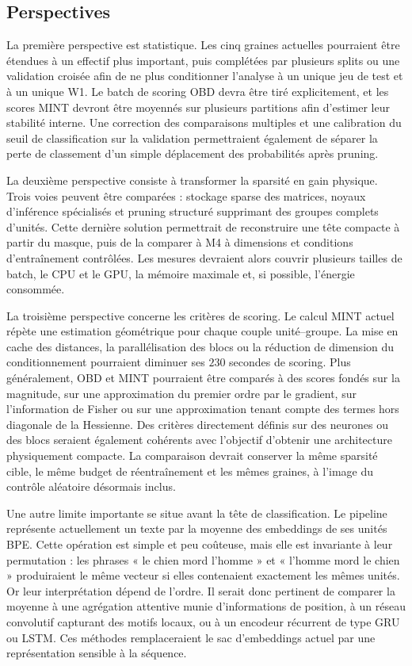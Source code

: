 \subsection{Perspectives}
\label{ssec:conclusion_perspectives}

La première perspective est statistique. Les cinq graines actuelles pourraient
être étendues à un effectif plus important, puis complétées par plusieurs splits
ou une validation croisée afin de ne plus conditionner l'analyse à un unique
jeu de test et à un unique W1. Le batch de scoring OBD devra être tiré
explicitement, et les scores MINT devront être moyennés sur plusieurs partitions
afin d'estimer leur stabilité interne. Une correction des comparaisons multiples
et une calibration du seuil de classification sur la validation permettraient
également de séparer la perte de classement d'un simple déplacement des
probabilités après pruning.

La deuxième perspective consiste à transformer la sparsité en gain physique.
Trois voies peuvent être comparées : stockage sparse des matrices, noyaux
d'inférence spécialisés et pruning structuré supprimant des groupes complets
d'unités. Cette dernière solution permettrait de reconstruire une tête compacte
à partir du masque, puis de la comparer à M4 à dimensions et conditions
d'entraînement contrôlées. Les mesures devraient alors couvrir plusieurs tailles
de batch, le CPU et le GPU, la mémoire maximale et, si possible, l'énergie
consommée.

La troisième perspective concerne les critères de scoring. Le calcul MINT
actuel répète une estimation géométrique pour chaque couple unité--groupe. La
mise en cache des distances, la parallélisation des blocs ou la réduction de
dimension du conditionnement pourraient diminuer ses $230$ secondes de
scoring. Plus généralement, OBD et MINT pourraient être comparés à des scores
fondés sur la magnitude, sur une approximation du premier ordre par le gradient,
sur l'information de Fisher ou sur une approximation tenant compte des termes
hors diagonale de la Hessienne. Des critères directement définis sur des
neurones ou des blocs seraient également cohérents avec l'objectif d'obtenir
une architecture physiquement compacte. La comparaison devrait conserver la
même sparsité cible, le même budget de réentraînement et les mêmes graines, à
l'image du contrôle aléatoire désormais inclus.

Une autre limite importante se situe avant la tête de classification. Le
pipeline représente actuellement un texte par la moyenne des embeddings de ses
unités BPE. Cette opération est simple et peu coûteuse, mais elle est invariante
à leur permutation : les phrases « le chien mord l'homme » et « l'homme mord le
chien » produiraient le même vecteur si elles contenaient exactement les mêmes
unités. Or leur interprétation dépend de l'ordre. Il serait donc pertinent de
comparer la moyenne à une agrégation attentive munie d'informations de position,
à un réseau convolutif capturant des motifs locaux, ou à un encodeur récurrent
de type GRU ou LSTM. Ces méthodes remplaceraient le sac d'embeddings actuel par
une représentation sensible à la séquence.

